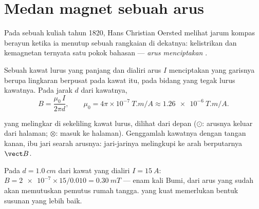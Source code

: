 \section{Medan magnet sebuah arus}

\begin{remark}[Oersted, 1820]\label{rem:g11:magnetic-fields:oersted}
Pada sebuah kuliah tahun 1820, Hans Christian Oersted melihat jarum
kompas berayun ketika ia menutup sebuah rangkaian di dekatnya:
kelistrikan dan kemagnetan ternyata satu pokok bahasan --- \emph{arus
menciptakan }.
\end{remark}

\begin{proposition}\label{prop:g11:magnetic-fields:wire}
Sebuah kawat lurus yang panjang dan dialiri arus $I$ menciptakan 
yang garisnya berupa lingkaran berpusat pada kawat itu, pada bidang
yang tegak lurus kawatnya. Pada jarak $d$ dari kawatnya,
\[
B = \frac{\mu_0\, I}{2\pi d},
\qquad \mu_0 = 4\pi\times 10^{-7}\ \unit{T.m/A} \approx \qty{1.26e-6}{T.m/A}.
\]
\end{proposition}
\admitted

\begin{omfigure}
\qquad\qquad
{}

{\small {} yang melingkar di sekeliling kawat lurus, dilihat
dari depan ($\odot$: arusnya keluar dari halaman; $\otimes$: masuk ke
halaman). Genggamlah kawatnya dengan tangan kanan, ibu jari searah
arusnya: jari-jarinya melingkupi ke arah berputarnya $\vect B$.}
\end{omfigure}

\begin{example}\label{ex:g11:magnetic-fields:wire}
Pada $d = \qty{1.0}{cm}$ dari kawat yang dialiri $I = \qty{15}{A}$:
$B = \num{2e-7} \times 15 / 0.010 = \qty{0.30}{mT}$ --- enam kali 
Bumi, dari arus yang sudah akan memutuskan pemutus rumah tangga. 
yang kuat memerlukan bentuk susunan yang lebih baik.
\end{example}

